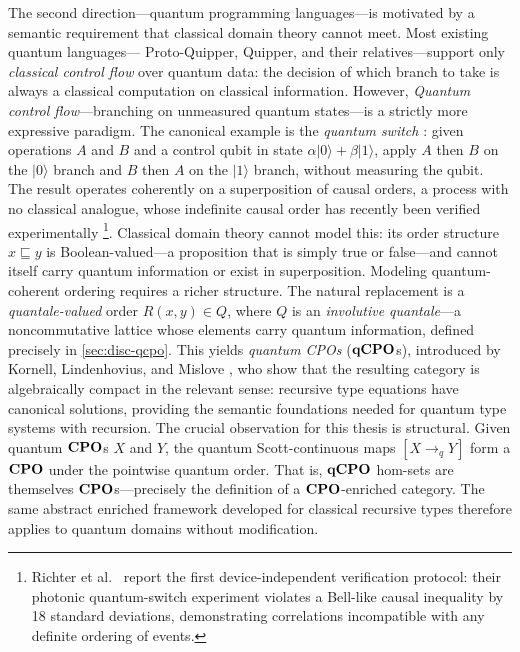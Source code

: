 The second direction---quantum programming languages---is motivated by a semantic requirement that classical domain theory cannot meet. Most existing quantum languages---
Proto-Quipper, Quipper, and their relatives---support only \textit{classical control flow} over quantum data: the decision of which 
branch to take is always a classical computation on classical information. However, \emph{Quantum control flow}---branching on unmeasured
quantum states---is a strictly more expressive paradigm. The canonical example is the \textit{quantum switch} \cite{CDPV2013}: 
given operations $A$ and $B$ and a control qubit in state $\alpha|0\rangle + \beta|1\rangle$, apply $A$ then $B$ on the $|0\rangle$
branch and $B$ then $A$ on the $|1\rangle$ branch, without measuring the qubit. The result operates coherently on a superposition of
causal orders, a process with no classical analogue, whose indefinite causal order has recently been verified experimentally
\footnote{Richter et al.\ \cite{RichterEtAl2025} report the first device-independent verification protocol: their photonic 
quantum-switch experiment violates a Bell-like causal inequality by 18 standard deviations, demonstrating correlations 
incompatible with any definite ordering of events.}. Classical domain theory cannot model this: its order structure $x \sqsubseteq y$ is 
Boolean-valued---a proposition that is simply true or false---and cannot itself carry quantum information or exist in superposition. 
Modeling quantum-coherent ordering requires a richer structure. The natural replacement is a \emph{quantale-valued} order $R(x, y) \in Q$, 
where $Q$ is an \textit{involutive quantale}---a noncommutative lattice whose elements carry quantum information, defined precisely 
in \cref{sec:disc-qcpo}. This yields \emph{quantum CPOs} ($\mathbf{qCPO}$s), introduced by Kornell, Lindenhovius, and Mislove \cite{KLM2024}, who 
show that the resulting category is algebraically compact in the relevant sense: recursive type equations have canonical solutions, 
providing the semantic foundations needed for quantum type systems with recursion. The crucial observation for this thesis is structural. 
Given quantum $\mathbf{CPO}$s $X$ and $Y$, the quantum Scott-continuous maps $[X \to_{q} Y]$ form a $\mathbf{CPO}$ under the pointwise quantum order. 
That is, $\mathbf{qCPO}$ hom-sets are themselves $\mathbf{CPO}$s---precisely the definition of a $\mathbf{CPO}$-enriched category. The same 
abstract enriched framework developed for classical recursive types therefore applies to quantum domains without 
modification.

